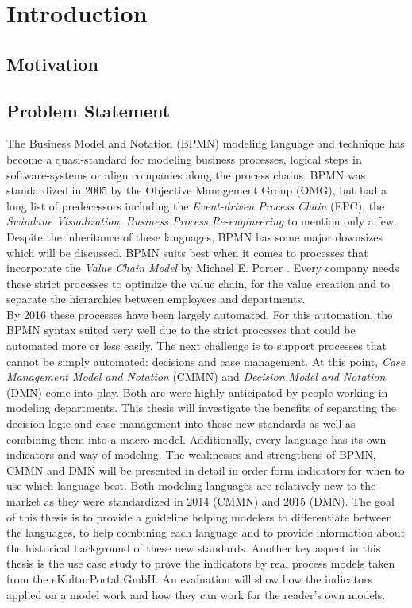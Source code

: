 \chapter{Introduction}
\label{chapter:Introduction}

\section{Motivation}

\section{Problem Statement}
The Business Model and Notation (BPMN) modeling language and technique has become a quasi-standard for modeling business processes, logical steps in software-systems or align companies along the process chains. BPMN was standardized in 2005 by the Objective Management Group (OMG), but had a long list of predecessors including the \textit{Event-driven Process Chain} (EPC), the \textit{Swimlane Visualization}, \textit{Business Process Re-engineering} to mention only a few. 
Despite the inheritance of these languages, BPMN has some major downsizes which will be discussed.
BPMN suits best when it comes to processes that incorporate the \textit{Value Chain Model} by Michael E. Porter \cite{Porter1988}. Every company needs these strict processes to optimize the value chain, for the value creation and to separate the hierarchies between employees and departments. \\
By 2016 these processes have been largely automated. For this automation, the BPMN syntax suited very well due to the strict processes that could be automated more or less easily. The next challenge is to support processes that cannot be simply automated: decisions and case management. 
At this point, \textit{Case Management Model and Notation} (CMMN) and \textit{Decision Model and Notation} (DMN) come into play. Both are were highly anticipated by people working in modeling departments. This thesis will investigate the benefits of separating the decision logic and case management into these new standards as well as combining them into a macro model. Additionally, every language has its own indicators and way of modeling. The weaknesses and strengthens of BPMN, CMMN and DMN will be presented in detail in order form indicators for when to use which language best. 
Both modeling languages are relatively new to the market as they were standardized in 2014 (CMMN) and 2015 (DMN). The goal of this thesis is to provide a guideline helping modelers to differentiate between the languages, to help combining each language and to provide information about the historical background of these new standards. 
Another key aspect in this thesis is the use case study to prove the indicators by real process models taken from the eKulturPortal GmbH. An evaluation will show how the indicators applied on a model work and how they can work for the reader's own models. 

